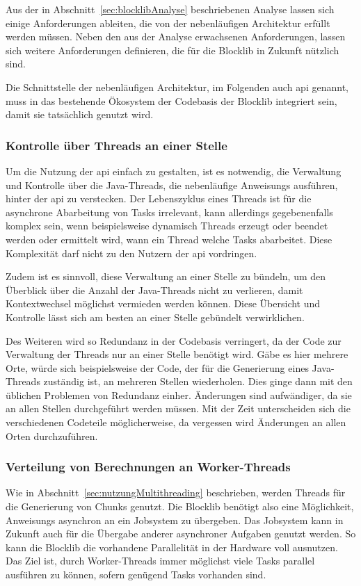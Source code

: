 Aus der in Abschnitt~\ref{sec:blocklibAnalyse} beschriebenen Analyse lassen sich einige Anforderungen ableiten, die von der nebenläufigen Architektur erfüllt werden müssen. Neben den aus der Analyse erwachsenen Anforderungen, lassen sich weitere Anforderungen definieren, die für die Blocklib in Zukunft nützlich sind.

Die Schnittstelle der nebenläufigen Architektur, im Folgenden auch \acs{api} genannt, muss in das bestehende Ökosystem der Codebasis der Blocklib integriert sein, damit sie tatsächlich genutzt wird.

\subsubsection{Kontrolle über Threads an einer Stelle}
Um die Nutzung der \acs{api} einfach zu gestalten, ist es notwendig, die Verwaltung und Kontrolle über die Java-Threads, die nebenläufige \glspl{Anweisung} ausführen, hinter der \acs{api} zu verstecken. Der Lebenszyklus eines Threads ist für die asynchrone Abarbeitung von Tasks irrelevant, kann allerdings gegebenenfalls komplex sein, wenn beispielsweise dynamisch Threads erzeugt oder beendet werden oder ermittelt wird, wann ein Thread welche Tasks abarbeitet. Diese Komplexität darf nicht zu den Nutzern der \acs{api} vordringen.

Zudem ist es sinnvoll, diese Verwaltung an einer Stelle zu bündeln, um den Überblick über die Anzahl der Java-Threads nicht zu verlieren, damit Kontextwechsel möglichst vermieden werden können. Diese Übersicht und Kontrolle lässt sich am besten an einer Stelle gebündelt verwirklichen.

Des Weiteren wird so Redundanz in der Codebasis verringert, da der Code zur Verwaltung der Threads nur an einer Stelle benötigt wird. Gäbe es hier mehrere Orte, würde sich beispielsweise der Code, der für die Generierung eines Java-Threads zuständig ist, an mehreren Stellen wiederholen. Dies ginge dann mit den üblichen Problemen von Redundanz einher. Änderungen sind aufwändiger, da sie an allen Stellen durchgeführt werden müssen. Mit der Zeit unterscheiden sich die verschiedenen Codeteile möglicherweise, da vergessen wird Änderungen an allen Orten durchzuführen.

\subsubsection{Verteilung von Berechnungen an Worker-Threads}
Wie in Abschnitt~\ref{sec:nutzungMultithreading} beschrieben, werden Threads für die Generierung von Chunks genutzt. Die Blocklib benötigt also eine Möglichkeit, \glspl{Anweisung} asynchron an ein Jobsystem zu übergeben. Das Jobsystem kann in Zukunft auch für die Übergabe anderer asynchroner Aufgaben genutzt werden. So kann die Blocklib die vorhandene Parallelität in der Hardware voll ausnutzen. Das Ziel ist, durch Worker-Threads immer möglichst viele Tasks parallel ausführen zu können, sofern genügend Tasks vorhanden sind.

